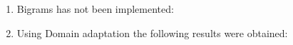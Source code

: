 \documentclass[12pt]{article}
\begin{document}
\begin{enumerate}[label=(\alph*)]
\item Bigrams has not been implemented:



\item Using Domain adaptation the following results were obtained:


\end{enumerate}
\end{document}
